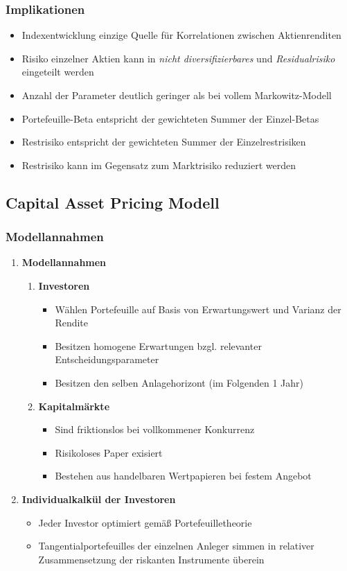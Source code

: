 \subsubsection{Implikationen}
\begin{itemize}
	\item Indexentwicklung einzige Quelle für Korrelationen zwischen Aktienrenditen
	\item Risiko einzelner Aktien kann in \textit{nicht diversifizierbares} und \textit{Residualrisiko} eingeteilt werden
	\item Anzahl der Parameter deutlich geringer als bei vollem Markowitz-Modell
	\item Portefeuille-Beta entspricht der gewichteten Summer der Einzel-Betas
	\item Restrisiko entspricht der gewichteten Summer der Einzelrestrisiken
	\item Restrisiko kann im Gegensatz zum Marktrisiko reduziert werden
\end{itemize}


\subsection{Capital Asset Pricing Modell}

\subsubsection{Modellannahmen}
\begin{enumerate}
	\item \textbf{Modellannahmen}
	\begin{enumerate}
		\item \textbf{Investoren}
		\begin{itemize}
			\item Wählen Portefeuille auf Basis von Erwartungswert und Varianz der Rendite
			\item Besitzen homogene Erwartungen bzgl. relevanter Entscheidungsparameter
			\item Besitzen den selben Anlagehorizont (im Folgenden 1 Jahr)
		\end{itemize}
		\item \textbf{Kapitalmärkte}
		\begin{itemize}
			\item Sind friktionslos bei vollkommener Konkurrenz
			\item Risikoloses Paper exisiert
			\item Bestehen aus handelbaren Wertpapieren bei festem Angebot
		\end{itemize}
	\end{enumerate}
	\item \textbf{Individualkalkül der Investoren}
	\begin{itemize}
		\item Jeder Investor optimiert gemäß Portefeuilletheorie
		\item Tangentialportefeuilles der einzelnen Anleger simmen in relativer Zusammensetzung der riskanten Instrumente überein
	\end{itemize}
\end{enumerate}

